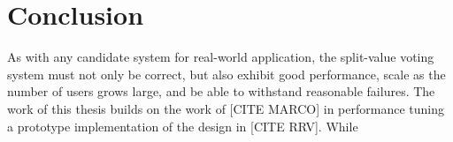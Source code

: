 \chapter{Conclusion}



As with any candidate system for real-world application, the split-value voting system must not only be correct, but also exhibit good performance, scale as the number of users grows large, and be able to withstand reasonable failures. The work of this thesis builds on the work of [CITE MARCO] in performance tuning a prototype implementation of the design in [CITE RRV]. While
